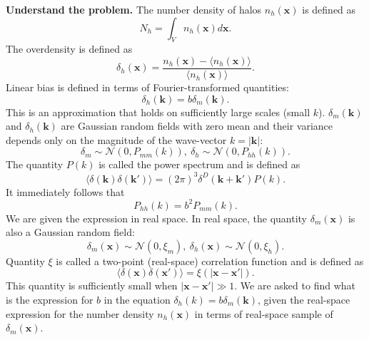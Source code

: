 \textbf{Understand the problem.} The number density of halos $n_h(\mathbf{x})$ is defined as
\begin{equation}    N_h = \int_{V} n_h(\mathbf{x})d\mathbf{x}.\end{equation}
The overdensity is defined as \begin{equation}    \delta_h(\mathbf{x}) = \frac{n_h(\mathbf{x})-\langle n_h(\mathbf{x})\rangle}{\langle n_h(\mathbf{x})\rangle}.\end{equation}
Linear bias is defined in terms of Fourier-transformed quantities:\begin{equation}    \delta_h(\mathbf{k}) = b\delta_m(\mathbf{k}).\end{equation} 
This is an approximation that holds on sufficiently large scales (small $k$). $\delta_m(\mathbf{k})$ and $\delta_h(\mathbf{k})$ are Gaussian random fields with zero mean and their variance depends only on the magnitude of the wave-vector $k=|\mathbf{k}|$: 
\begin{equation}    \delta_m \sim \mathcal{N}(0,P_{mm}(k)),\ \delta_h \sim \mathcal{N}(0,P_{hh}(k)).\end{equation}The quantity $P(k)$ is called the power spectrum and is defined as \begin{equation}    \langle\delta(\mathbf{k})\delta(\mathbf{k'})\rangle = (2\pi)^3\delta^D(\mathbf{k+k'})P(k).\end{equation}
It immediately follows that\begin{equation}    P_{hh}(k) = b^2P_{mm}(k).\end{equation}
We are given the expression in real space. In real space, the quantity $\delta_m(\mathbf{x})$ is also a Gaussian random field:\begin{equation}    \delta_m(\mathbf{x}) \sim \mathcal{N}(0, \xi_m),\ \delta_h(\mathbf{x}) \sim \mathcal{N}(0, \xi_h).\end{equation}
Quantity $\xi$ is called a two-point (real-space) correlation function and is defined as\begin{equation}    \langle\delta(\mathbf{x})\delta(\mathbf{x'})\rangle = \xi(|\mathbf{x}-\mathbf{x'}|).\end{equation}This quantity is sufficiently small when $|\mathbf{x}-\mathbf{x'}|\gg1$. We are asked to find what is the expression for $b$ in the equation $\delta_h(k) = b\delta_m(\mathbf{k})$, given the real-space expression for the number density $n_h(\mathbf{x})$ in terms of real-space sample of $\delta_m(\mathbf{x})$.\\

